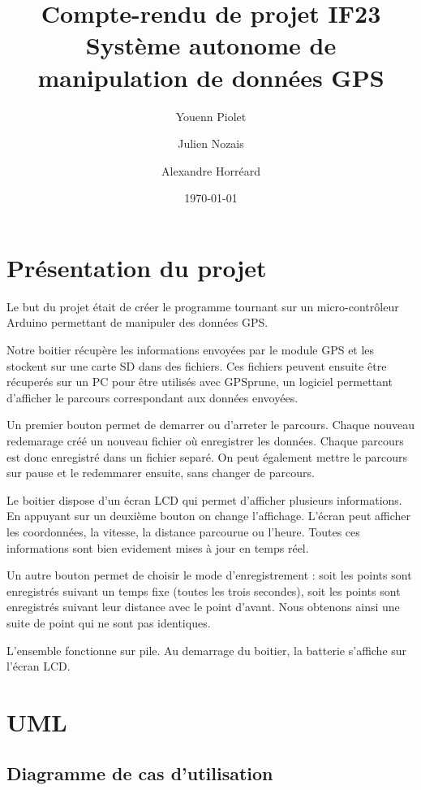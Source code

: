 \documentclass[a4paper,12pt,titlepage]{article}
\title{Compte-rendu de projet IF23\\Système autonome de manipulation de données GPS}
\author{Youenn Piolet \and Julien Nozais \and Alexandre Horréard}
\date{\today} %
\begin{document}
\maketitle

\newpage

\section{Présentation du projet}

Le but du projet était de créer le programme tournant sur un micro-contrôleur Arduino permettant de manipuler des données GPS.

Notre boitier récupère les informations envoyées par le module GPS et les stockent sur une carte SD dans des fichiers. 
Ces fichiers peuvent ensuite être récuperés sur un PC pour être utilisés avec GPSprune, un logiciel permettant d'afficher
le parcours correspondant aux données envoyées.

Un premier bouton permet de demarrer ou d'arreter le parcours. Chaque nouveau redemarage créé un nouveau fichier où enregistrer les données.
Chaque parcours est donc enregistré dans un fichier separé. On peut également mettre le parcours sur pause et le redemmarer ensuite, sans changer de parcours.

Le boitier dispose d'un écran LCD qui permet d'afficher plusieurs informations. En appuyant sur un deuxième bouton on change l'affichage.
L'écran peut afficher les coordonnées, la vitesse, la distance parcourue ou l'heure. Toutes ces informations sont bien evidement mises à jour en temps réel.

Un autre bouton permet de choisir le mode d'enregistrement : soit les points sont enregistrés suivant un temps fixe (toutes les trois secondes),
soit les points sont enregistrés suivant leur distance avec le point d'avant. Nous obtenons ainsi une suite de point qui ne sont pas identiques.

L'ensemble fonctionne sur pile. Au demarrage du boitier, la batterie s'affiche sur l'écran LCD.


\section{UML}

\subsection{Diagramme de cas d'utilisation}
\end{document}
